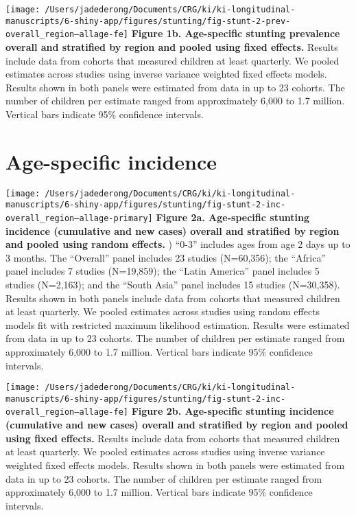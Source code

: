 \documentclass[9pt,]{book}
\begin{document}
\texttt{[image: /Users/jadederong/Documents/CRG/ki/ki-longitudinal-manuscripts/6-shiny-app/figures/stunting/fig-stunt-2-prev-overall\_region--allage-fe]}
\textbf{Figure 1b. Age-specific stunting prevalence overall and stratified by region and pooled using fixed effects. } Results include data from cohorts that measured children at least quarterly. We pooled estimates across studies using inverse variance weighted fixed effects models. Results shown in both panels were estimated from data in up to 23 cohorts. The number of children per estimate ranged from approximately 6,000 to 1.7 million. Vertical bars indicate 95\% confidence intervals.

\hypertarget{age-specific-incidence}{%
\section{Age-specific incidence}\label{age-specific-incidence}}

\texttt{[image: /Users/jadederong/Documents/CRG/ki/ki-longitudinal-manuscripts/6-shiny-app/figures/stunting/fig-stunt-2-inc-overall\_region--allage-primary]}
\textbf{Figure 2a. Age-specific stunting incidence (cumulative and new cases) overall and stratified by region and pooled using random effects.} ) ``0-3'' includes ages from age 2 days up to 3 months. The ``Overall'' panel includes 23 studies (N=60,356); the ``Africa'' panel includes 7 studies (N=19,859); the ``Latin America'' panel includes 5 studies (N=2,163); and the ``South Asia'' panel includes 15 studies (N=30,358). Results shown in both panels include data from cohorts that measured children at least quarterly. We pooled estimates across studies using random effects models fit with restricted maximum likelihood estimation. Results were estimated from data in up to 23 cohorts. The number of children per estimate ranged from approximately 6,000 to 1.7 million. Vertical bars indicate 95\% confidence intervals.

\texttt{[image: /Users/jadederong/Documents/CRG/ki/ki-longitudinal-manuscripts/6-shiny-app/figures/stunting/fig-stunt-2-inc-overall\_region--allage-fe]}
\textbf{Figure 2b. Age-specific stunting incidence (cumulative and new cases) overall and stratified by region and pooled using fixed effects.} Results include data from cohorts that measured children at least quarterly. We pooled estimates across studies using inverse variance weighted fixed effects models. Results shown in both panels were estimated from data in up to 23 cohorts. The number of children per estimate ranged from approximately 6,000 to 1.7 million. Vertical bars indicate 95\% confidence intervals.
\end{document}
